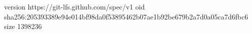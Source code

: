version https://git-lfs.github.com/spec/v1
oid sha256:205393389e94e014bf98da0f53895462b07ae1b92be679b2a7d0a05ca7d6fbc6
size 1398236
